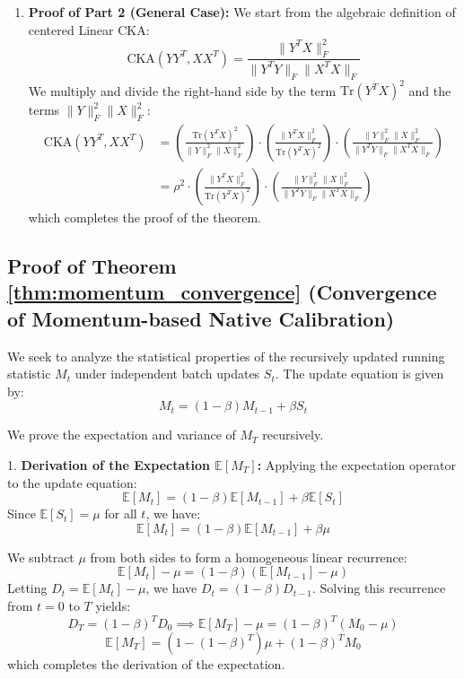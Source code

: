 \documentclass{article}
\theoremstyle{plain}
\theoremstyle{definition}
\theoremstyle{remark}
\begin{document}
\begin{enumerate}
    \item \textbf{Proof of Part 2 (General Case):}
    We start from the algebraic definition of centered Linear CKA:
    $$\text{CKA}(YY^T, XX^T) = \frac{\|Y^T X\|_F^2}{\|Y^T Y\|_F \|X^T X\|_F}$$
    We multiply and divide the right-hand side by the term $\text{Tr}(Y^T X)^2$ and the terms $\|Y\|_F^2 \|X\|_F^2$:
    \begin{align*}
    \text{CKA}(YY^T, XX^T) &= \left( \frac{\text{Tr}(Y^T X)^2}{\|Y\|_F^2 \|X\|_F^2} \right) \cdot \left( \frac{\|Y^T X\|_F^2}{\text{Tr}(Y^T X)^2} \right) \cdot \left( \frac{\parallel Y \parallel_F^2 \parallel X \parallel_F^2}{\|Y^T Y\|_F \|X^T X\|_F} \right) \\
    &= \rho^2 \cdot \left( \frac{\|Y^T X\|_F^2}{\text{Tr}(Y^T X)^2} \right) \cdot \left( \frac{\|Y\|_F^2 \|X\|_F^2}{\|Y^T Y\|_F \|X^T X\|_F} \right)
    \end{align*}
    which completes the proof of the theorem.
\end{enumerate}

\subsection{Proof of Theorem \ref{thm:momentum_convergence} (Convergence of Momentum-based Native Calibration)}
We seek to analyze the statistical properties of the recursively updated running statistic $M_t$ under independent batch updates $S_t$.
The update equation is given by:
$$M_t = (1 - \beta) M_{t-1} + \beta S_t$$

We prove the expectation and variance of $M_T$ recursively.

1. \textbf{Derivation of the Expectation $\mathbb{E}[M_T]$:}
Applying the expectation operator to the update equation:
$$\mathbb{E}[M_t] = (1 - \beta) \mathbb{E}[M_{t-1}] + \beta \mathbb{E}[S_t]$$
Since $\mathbb{E}[S_t] = \mu$ for all $t$, we have:
$$\mathbb{E}[M_t] = (1 - \beta) \mathbb{E}[M_{t-1}] + \beta \mu$$

We subtract $\mu$ from both sides to form a homogeneous linear recurrence:
$$\mathbb{E}[M_t] - \mu = (1 - \beta) \left( \mathbb{E}[M_{t-1}] - \mu \right)$$
Letting $D_t = \mathbb{E}[M_t] - \mu$, we have $D_t = (1 - \beta) D_{t-1}$. Solving this recurrence from $t=0$ to $T$ yields:
$$D_T = (1 - \beta)^T D_0 \implies \mathbb{E}[M_T] - \mu = (1 - \beta)^T \left( M_0 - \mu \right)$$
$$\mathbb{E}[M_T] = \left( 1 - (1 - \beta)^T \right) \mu + (1 - \beta)^T M_0$$
which completes the derivation of the expectation.
\end{document}
